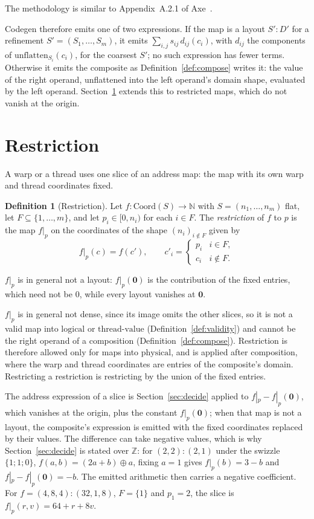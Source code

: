 \documentclass[11pt]{article}
\theoremstyle{definition}
\newtheorem{definition}{Definition}
\newcommand{\logical}{\textrm{logical}}
\newcommand{\physical}{\textrm{physical}}
\newcommand{\tv}{\textrm{thread-value}}
\newcommand{\N}{\mathbb{N}}
\newcommand{\Z}{\mathbb{Z}}
\begin{document}
The methodology is similar to Appendix~A.2.1 of Axe~\cite{axe}.

Codegen therefore emits one of two expressions. If the map is a layout
$S'{:}D'$ for a refinement $S' = (S_1,\dots,S_m)$, it emits
$\sum_{i,j} s_{ij}\, d_{ij}(c_i)$, with $d_{ij}$ the components of
$\mathrm{unflatten}_{S_i}(c_i)$, for the coarsest $S'$; no such expression has
fewer terms. Otherwise it emits the composite as Definition~\ref{def:compose}
writes it: the value of the right operand, unflattened into the left operand's
domain shape, evaluated by the left operand. Section~\ref{sec:restrict}
extends this to restricted maps, which do not vanish at the origin.


\section{Restriction}\label{sec:restrict}

A warp or a thread uses one slice of an address map: the map with its own
warp and thread coordinates fixed.

\begin{definition}[Restriction]\label{def:restrict}
Let $f : \mathrm{Coord}(S) \to \N$ with $S = (n_1,\dots,n_m)$ flat, let
$F \subseteq \{1,\dots,m\}$, and let $p_i \in [0,n_i)$ for each $i \in F$.
The \emph{restriction} of $f$ to $p$ is the map $f|_p$ on the coordinates of
the shape $(n_i)_{i \notin F}$ given by
\[
f|_p(c) = f(c'), \qquad
c'_i = \begin{cases} p_i & i \in F,\\ c_i & i \notin F. \end{cases}
\]
\end{definition}

$f|_p$ is in general not a layout: $f|_p(\mathbf{0})$ is the contribution
of the fixed entries, which need not be $0$, while every layout vanishes at
$\mathbf{0}$.

$f|_p$ is in general not dense, since its image omits the other slices, so
it is not a valid map into $\logical$ or $\tv$ (Definition~\ref{def:validity})
and cannot be the right operand of a composition
(Definition~\ref{def:compose}). Restriction is therefore allowed only for
maps into $\physical$, and is applied after composition, where the warp and
thread coordinates are entries of the composite's domain. Restricting a
restriction is restricting by the union of the fixed entries.

The address expression of a slice is Section~\ref{sec:decide} applied to
$f|_p - f|_p(\mathbf{0})$, which vanishes at the origin, plus the constant
$f|_p(\mathbf{0})$; when that map is not a layout, the composite's expression
is emitted with the fixed coordinates replaced by their values. The difference
can take negative values, which is why Section~\ref{sec:decide} is stated
over $\Z$: for $(2,2){:}(2,1)$ under the swizzle $\{1;1;0\}$,
$f(a,b) = (2a+b) \oplus a$, fixing $a = 1$ gives $f|_p(b) = 3 - b$ and
$f|_p - f|_p(\mathbf{0}) = -b$. The emitted arithmetic then carries a negative
coefficient. For
$f = (4,8,4){:}(32,1,8)$, $F = \{1\}$ and $p_1 = 2$, the slice is
$f|_p(r,v) = 64 + r + 8v$.
\end{document}
